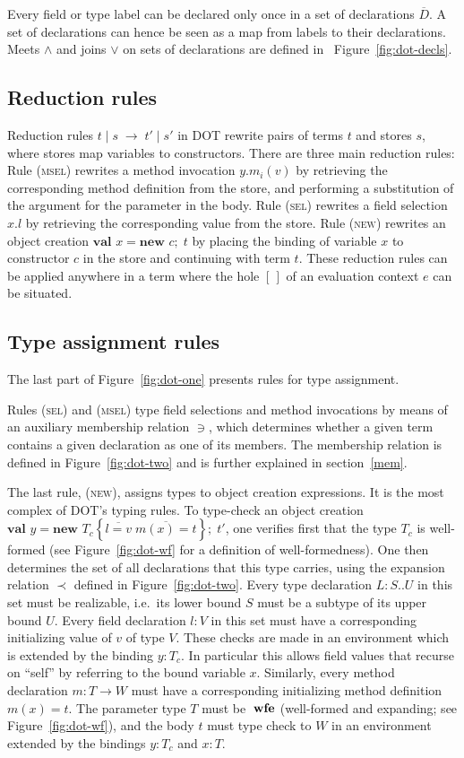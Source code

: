 \documentclass[9pt]{sigplanconf}
\newcommand{\figref}[1]
        {Figure~\ref{fig:#1}}
\newcommand{\expand}{\prec}
\newcommand{\reduces}{\;\rightarrow\;}
\newcommand{\wfe}{\;\mbox{\textbf{wfe}}}
\newcommand{\tfun}{\rightarrow}
\newcommand{\ldefs}[1]{\left\{#1\right\}}
\newcommand{\seq}[1]{\overline{#1}}
\newcommand{\mapp}[3]{#1.#2(#3)}
\newcommand{\new}[3]{\textbf{val }#1 = \textbf{new }#2 ;\; #3}
\newcommand{\Ldecl}[3]{#1 : #2..#3}%
\newcommand{\ldecl}[2]{#1 : #2}
\newcommand{\mdecl}[3]{#1 : #2 \tfun #3}
\newcommand{\reduction}[4]{#1 \operatorname{|} #2 \reduces #3 \operatorname{|} #4}
\begin{document}
Every field or type label can be declared only once in a set of
declarations $\seq D$. A set of declarations can hence be seen as a map from
labels to their declarations.  Meets $\wedge$ and joins $\vee$ on sets of
declarations are defined in ~\figref{dot-decls}.

\subsection{Reduction rules}

Reduction rules $\reduction t s {t'} {s'}$ in DOT rewrite pairs of
terms $t$ and stores $s$, where stores map variables to constructors.
There are three main reduction rules: Rule (\textsc{msel}) rewrites a
method invocation $\mapp y {m_i} v$ by retrieving the corresponding method
definition from the store, and performing a substitution of the
argument for the parameter in the body. Rule (\textsc{sel}) rewrites a
field selection $x.l$ by retrieving the corresponding value from the
store. Rule (\textsc{new}) rewrites an object creation $\new x c t$ by
placing the binding of variable $x$ to constructor $c$ in the store
and continuing with term $t$.  These reduction rules can be applied
anywhere in a term where the hole $[\,]$ of an evaluation context $e$
can be situated.

\subsection{Type assignment rules}

The last part of \figref{dot-one} presents rules for type
assignment.  

Rules (\textsc{sel}) and (\textsc{msel}) type field selections and
method invocations by means of an auxiliary membership relation $\ni$,
which determines whether a given term contains a given declaration as
one of its members. The membership relation is defined in
\figref{dot-two} and is further explained in section~\ref{mem}.

The last rule, (\textsc{new}), assigns types to object creation
expressions. It is the most complex of DOT's typing rules.  To
type-check an object creation $\new y {T_c \ldefs {\seq{l =
      v}\;\seq{m(x) = t}}} t'$, one verifies first that the type $T_c$
is well-formed (see \figref{dot-wf} for a definition of
well-formedness).  One then determines the set of all declarations
that this type carries, using the expansion relation $\expand$ defined
in \figref{dot-two}.  Every type declaration $\Ldecl L S U$ in
this set must be realizable, i.e.\ its lower bound $S$ must be a
subtype of its upper bound $U$.  Every field declaration $\ldecl l V$
in this set must have a corresponding initializing value of $v$ of
type $V$.  These checks are made in an environment which is extended
by the binding $y: T_c$. In particular this allows field values that
recurse on ``self'' by referring to the bound variable $x$. Similarly,
every method declaration $\mdecl m T W$ must have a corresponding
initializing method definition $m(x) = t$. The parameter type $T$ must
be $\wfe$ (well-formed and expanding; see \figref{dot-wf}), and
the body $t$ must type check to $W$ in an environment extended by the
bindings $y : T_c$ and $x : T$.
\end{document}
